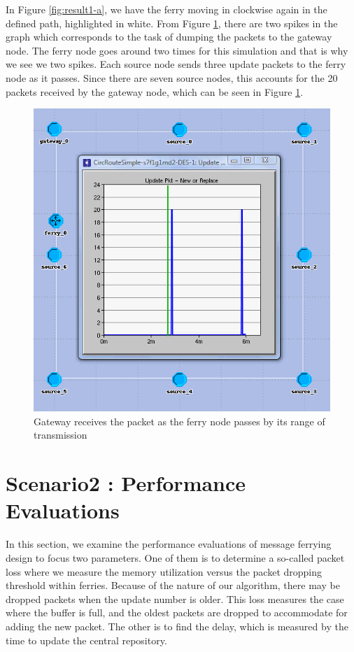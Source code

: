 In Figure \ref{fig:result1-a}, we have the ferry moving in clockwise again in the defined path, highlighted in white.  
From Figure \ref{fig:result1-b}, there are two spikes in the graph which corresponds to the task of dumping the packets to the gateway node.  
The ferry node goes around two times for this simulation and that is why we see we two spikes.  
Each source node sends three update packets to the ferry node as it passes.  
Since there are seven source nodes, this accounts for the 20 packets received by the gateway node, which can be seen in Figure \ref{fig:result1-b}.


\begin{figure}[h]
    \centering
    \includegraphics[width=.5\textwidth]{images/scenario1-result-gateway}
    \caption{Gateway receives the packet as the ferry node passes by its range of transmission}
    \label{fig:result1-b}
\end{figure}





\section{Scenario2 : Performance Evaluations}
\label{sec:scenario2}

In this section, we examine the performance evaluations of message ferrying design to focus two parameters.  
One of them is to determine a so-called packet loss where we measure the memory utilization versus the packet dropping threshold within ferries.
Because of the nature of our algorithm, there may be dropped packets when the update number is older.
This loss measures the case where the buffer is full, and the oldest packets are dropped to accommodate for adding the new packet.  
The other is to find the delay, which is measured by the time to update the central repository.

